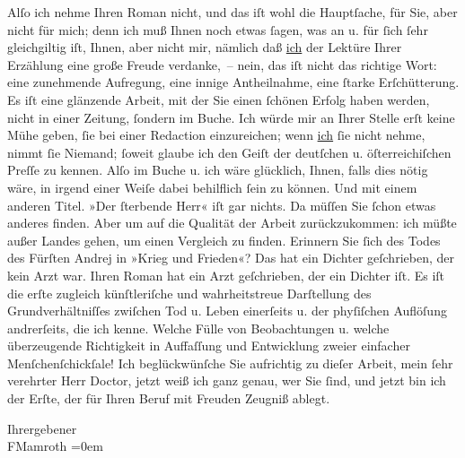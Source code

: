 \pstart
           Alſo ich nehme Ihren Roman
               nicht, und das iſt wohl die Hauptſache, für Sie, aber nicht für mich; denn ich muß
               Ihnen noch etwas ſagen, was an u. für ſich ſehr gleichgiltig iſt, Ihnen, aber nicht
               mir, nämlich daß {\pb}\uline{ich} der Lektüre Ihrer Erzählung eine große Freude verdanke, – nein, das iſt
                   nicht das richtige Wort: eine zunehmende Aufregung, eine innige
               Antheilnahme, eine ſtarke Erſchütterung. Es iſt eine glänzende Arbeit, mit der Sie
               einen ſchönen Erfolg haben werden, nicht in einer Zeitung, ſondern im Buche. Ich
               würde mir an Ihrer Stelle erſt keine Mühe geben, ſie bei einer Redaction
               einzureichen; wenn \uline{ich}{ }ſie nicht nehme, nimmt ſie Niemand; ſoweit glaube
               ich den Geiſt der deutſchen u. öſterreichiſchen Preſſe zu kennen. Alſo im Buche
               u. ich wäre glücklich, Ihnen, falls dies nötig wäre, in irgend einer Weiſe dabei
               behilflich ſein zu können. Und mit einem anderen Titel. »Der ſterbende Herr« iſt gar nichts. Da müſſen Sie ſchon etwas
               anderes finden. Aber um auf die Qualität der Arbeit zurückzukommen: ich müßte außer
               Landes gehen, um einen Vergleich zu finden. Erinnern Sie ſich des Todes des Fürſten
               Andrej in »Krieg und Frieden«? Das hat ein Dichter geſchrieben, der kein
               Arzt war. Ihren Roman hat ein Arzt geſchrieben, der ein Dichter iſt. Es iſt die erſte
               zugleich künſtleriſche und wahrheitstreue Darſtellung des Grundverhältniſſes zwiſchen
               Tod u. Leben einerſeits u. der phyſiſchen Auflöſung andrerſeits, die ich kenne.
               Welche Fülle von Beobachtungen u. welche überzeugende Richtigkeit in Auffaſſung und
               Entwicklung zweier einfacher Menſchenſchickſale! Ich beglückwünſche Sie aufrichtig zu
               dieſer Arbeit, mein ſehr verehrter Herr Doctor, jetzt weiß ich ganz genau, wer Sie
               ſind, und jetzt bin ich der Erſte, der für Ihren Beruf mit Freuden Zeugniß
               ablegt.\pend
           
\pstart
           Ihr\hspace*{1.5em}ergebener{\\[\baselineskip]}\spacefill\mbox{FMamroth}\pend
           \leftskip=0em{}\endnumbering{}  
      